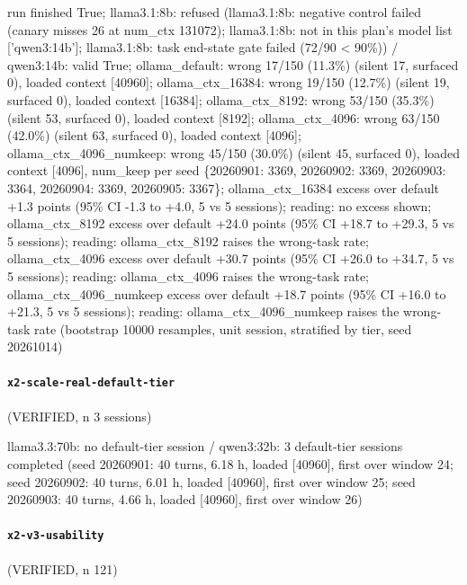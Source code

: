 {\footnotesize\raggedright run finished True; llama3.1:8b: refused (llama3.1:8b: negative control failed (canary misses 26 at num\_ctx 131072); llama3.1:8b: not in this plan's model list ['qwen3:14b']; llama3.1:8b: task end-state gate failed (72/90 \textless{} 90\%)) / qwen3:14b: valid True; ollama\_default: wrong 17/150 (11.3\%) (silent 17, surfaced 0), loaded context [40960]; ollama\_ctx\_16384: wrong 19/150 (12.7\%) (silent 19, surfaced 0), loaded context [16384]; ollama\_ctx\_8192: wrong 53/150 (35.3\%) (silent 53, surfaced 0), loaded context [8192]; ollama\_ctx\_4096: wrong 63/150 (42.0\%) (silent 63, surfaced 0), loaded context [4096]; ollama\_ctx\_4096\_numkeep: wrong 45/150 (30.0\%) (silent 45, surfaced 0), loaded context [4096], num\_keep per seed \{20260901: 3369, 20260902: 3369, 20260903: 3364, 20260904: 3369, 20260905: 3367\}; ollama\_ctx\_16384 excess over default +1.3 points (95\% CI -1.3 to +4.0, 5 vs 5 sessions); reading: no excess shown; ollama\_ctx\_8192 excess over default +24.0 points (95\% CI +18.7 to +29.3, 5 vs 5 sessions); reading: ollama\_ctx\_8192 raises the wrong-task rate; ollama\_ctx\_4096 excess over default +30.7 points (95\% CI +26.0 to +34.7, 5 vs 5 sessions); reading: ollama\_ctx\_4096 raises the wrong-task rate; ollama\_ctx\_4096\_numkeep excess over default +18.7 points (95\% CI +16.0 to +21.3, 5 vs 5 sessions); reading: ollama\_ctx\_4096\_numkeep raises the wrong-task rate (bootstrap 10000 resamples, unit session, stratified by tier, seed 20261014)\par}

\paragraph{\texttt{x2-scale-real-default-tier}} (VERIFIED, n 3 sessions)

{\footnotesize\raggedright llama3.3:70b: no default-tier session / qwen3:32b: 3 default-tier sessions completed (seed 20260901: 40 turns, 6.18 h, loaded [40960], first over window 24; seed 20260902: 40 turns, 6.01 h, loaded [40960], first over window 25; seed 20260903: 40 turns, 4.66 h, loaded [40960], first over window 26)\par}

\paragraph{\texttt{x2-v3-usability}} (VERIFIED, n 121)

